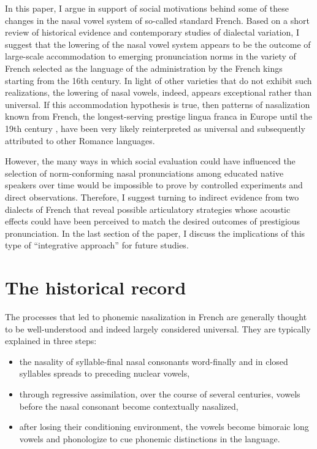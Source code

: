 \documentclass[output=paper,colorlinks,citecolor=brown]{langscibook}
\begin{document}
In this paper, I argue in support of social motivations behind some of these changes in the nasal vowel system of so-called standard French. Based on a short review of historical evidence and contemporary studies of dialectal variation, I suggest that the lowering of the nasal vowel system appears to be the outcome of large-scale accommodation to emerging pronunciation norms in the variety of French selected as the language of the administration by the French kings starting from the 16th century. In light of other varieties that do not exhibit such realizations, the lowering of nasal vowels, indeed, appears exceptional rather than universal. If this accommodation hypothesis is true, then patterns of nasalization known from French, the longest-serving prestige lingua franca in Europe until the 19th century \citep[][]{Wright2004}, have been very likely reinterpreted as universal and subsequently attributed to other Romance languages.

However, the many ways in which social evaluation could have influenced the selection of norm-conforming nasal pronunciations among educated native speakers over time would be impossible to prove by controlled experiments and direct observations. Therefore, I suggest turning to indirect evidence from two dialects of French that reveal possible articulatory strategies whose acoustic effects could have been perceived to match the desired outcomes of prestigious pronunciation. In the last section of the paper, I discuss the implications of this type of ``integrative approach'' for future studies.

\section{The historical record}
The processes that led to phonemic nasalization in French are generally thought to be well-understood and indeed largely considered universal. They are typically explained in three steps:
\begin{itemize}
    \item the nasality of syllable-final nasal consonants word-finally and in closed syllables spreads to preceding nuclear vowels,
    \item through regressive assimilation, over the course of several centuries, vowels before the nasal consonant become contextually nasalized,
    \item after losing their conditioning environment, the vowels become bimoraic long vowels and phonologize to cue phonemic distinctions in the language.
\end{itemize}
\end{document}
